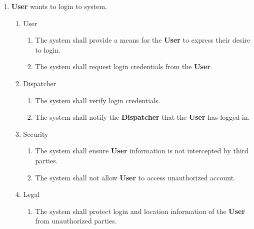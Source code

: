 \documentclass[english]{article}
\begin{document}
\begin{enumerate}[{BE}1.]
	\item \textbf{User} wants to login to system.
	\begin{enumerate}[{VP2}.1]
		\item User
			\begin{enumerate}
				\item The system shall provide a means for the \textbf{User} to express their desire to login. 
				\item The system shall request login credentials from the \textbf{User}.
			\end{enumerate}
		\item Dispatcher
			\begin{enumerate}
			    \item The system shall verify login credentials.
			    \item The system shall notify the \textbf{Dispatcher} that the \textbf{User} has logged in. 
			\end{enumerate}
		\item Security
			\begin{enumerate}
				\item The system shall ensure \textbf{User} information is not intercepted by third parties.
				\item The system shall not allow \textbf{User} to access unauthorized account. 
			\end{enumerate}
		\item Legal
			\begin{enumerate}
				\item The system shall protect login and location information of the \textbf{User} from unauthorized parties.
			\end{enumerate}
	\end{enumerate}


\end{enumerate}
\end{document}

